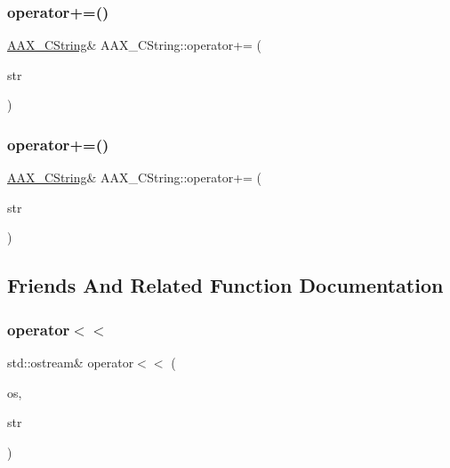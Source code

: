 \mbox{\label{a01573_a771f06413be5ec1e228aaa2c9ea2b4fa}} 
\subsubsection{\texorpdfstring{operator+=()}{operator+=()}\hspace{0.1cm}{\footnotesize\ttfamily [2/3]}}
{\footnotesize\ttfamily \mbox{\hyperlink{a01573}{A\+A\+X\+\_\+\+C\+String}}\& A\+A\+X\+\_\+\+C\+String\+::operator+= (\begin{DoxyParamCaption}\item[{const std\+::string \&}]{str }\end{DoxyParamCaption})}

\mbox{\label{a01573_ae339e119bf41150c10e06f6912f8b14c}} 
\subsubsection{\texorpdfstring{operator+=()}{operator+=()}\hspace{0.1cm}{\footnotesize\ttfamily [3/3]}}
{\footnotesize\ttfamily \mbox{\hyperlink{a01573}{A\+A\+X\+\_\+\+C\+String}}\& A\+A\+X\+\_\+\+C\+String\+::operator+= (\begin{DoxyParamCaption}\item[{const char $\ast$}]{str }\end{DoxyParamCaption})}



\subsection{Friends And Related Function Documentation}
\mbox{\label{a01573_a96d2487d89ed481026b9d07ee7aab5d2}} 
\subsubsection{\texorpdfstring{operator$<$$<$}{operator<<}}
{\footnotesize\ttfamily std\+::ostream\& operator$<$$<$ (\begin{DoxyParamCaption}\item[{std\+::ostream \&}]{os,  }\item[{const \mbox{\hyperlink{a01573}{A\+A\+X\+\_\+\+C\+String}} \&}]{str }\end{DoxyParamCaption})\hspace{0.3cm}{\ttfamily [friend]}}

